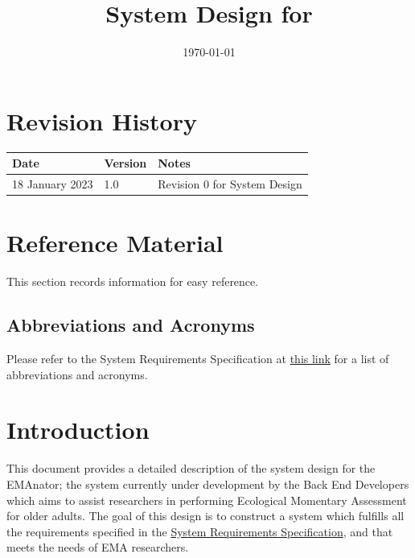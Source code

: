 \documentclass[12pt, titlepage]{article}
\begin{document}
\title{System Design for \progname{}} 
\author{\authname}
\date{\today}

\maketitle


\section{Revision History}

\begin{tabularx}{\textwidth}{p{3cm}p{2cm}X}
\toprule {\bf Date} & {\bf Version} & {\bf Notes}\\
\midrule
18 January 2023 & 1.0 & Revision 0 for System Design\\
\bottomrule
\end{tabularx}

\newpage

\section{Reference Material}

This section records information for easy reference.

\subsection{Abbreviations and Acronyms}

Please refer to the System Requirements Specification at \href{https://github.com/zakerl/Capstone_Project/blob/desDoc_Labeeb/docs/SRS/SRS.pdf}{this link} for a list of abbreviations and acronyms.

\newpage

\tableofcontents

\newpage

\listoftables

\listoffigures

\newpage


\section{Introduction}

This document provides a detailed description of the system design for the EMAnator; the system currently under development by the Back End Developers which aims to assist researchers in performing Ecological Momentary Assessment for older adults. The goal of this design is to construct a system which fulfills all the requirements specified in the \href{https://github.com/zakerl/Capstone_Project/blob/desDoc_Labeeb/docs/SRS/SRS.pdf}{System Requirements Specification}, and that meets the needs of EMA researchers.\\
\end{document}
